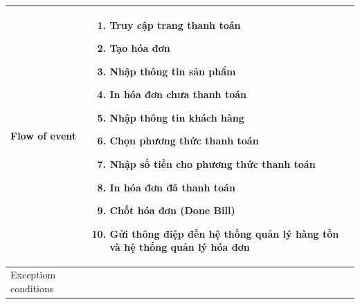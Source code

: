 \documentclass{article}
\begin{document}
		\begin{tabular}{|m{4cm}|m{12cm}|}
		\hline
		Flow of event &
		\begin{enumerate}
				\item	Truy cập trang thanh toán
				\item Tạo hóa đơn
				\item Nhập thông tin sản phẩm
				\item In hóa đơn chưa thanh toán
				\item Nhập thông tin khách hàng
				\item \textbf{Chọn phương thức thanh toán}
				\item \textbf{Nhập số tiền cho phương thức thanh toán}
				\item In hóa đơn đã thanh toán
				\item Chốt hóa đơn (Done Bill)
				\item Gửi thông điệp đến hệ thống quản lý hàng tồn và hệ thống quản lý hóa đơn
			\end{enumerate}\\ 
		\hline
		Exceptiom conditions & \\
		\hline
\end{tabular}\\[0.3cm]
\end{document}
